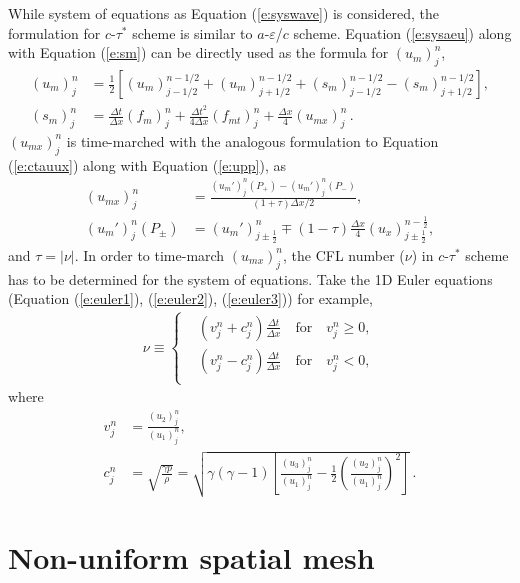 \documentclass[11pt,dvips]{article}
\numberwithin{equation}{section}
\begin{document}
While system of equations as Equation (\ref{e:syswave}) is considered, the
formulation for $c$-$\tau^*$ scheme is similar to $a$-$\varepsilon$/$c$ scheme.
Equation (\ref{e:sysaeu}) along with Equation (\ref{e:sm}) can be directly used
as the formula for $(u_m)_j^n$,
\begin{align*}
  (u_m)_j^n &= \frac{1}{2}\left[
      (u_m)_{j-1/2}^{n-1/2} + (u_m)_{j+1/2}^{n-1/2}
    + (s_m)_{j-1/2}^{n-1/2} - (s_m)_{j+1/2}^{n-1/2}
    \right], \\
  (s_m)_j^n &=
      \frac{\Delta t}  {\Delta x} (f_m)_j^n
    + \frac{\Delta t^2}{4\Delta x}(f_{mt})_j^n
    + \frac{\Delta x}  {4}        (u_{mx})_j^n\,.
\end{align*}
$(u_{mx})_j^n$ is time-marched with the analogous formulation to
Equation (\ref{e:ctauux}) along with Equation (\ref{e:upp}), as
\begin{align}
  (u_{mx})_j^n &=
    \frac{(u_m')_j^n(P_+)-(u_m')_j^n(P_-)}
         {(1+\tau)\Delta x/2}, \\
  (u_m')_j^n(P_{\pm}) &=
        (u_m')_{j\pm\frac{1}{2}}^n
    \mp (1-\tau)\frac{\Delta x}{4}(u_x)_{j\pm\frac{1}{2}}^{n-\frac{1}{2}},
\end{align}
and $\tau=|\nu|$.  In order to time-march $(u_{mx})_j^n$, the CFL number
($\nu$) in $c$-$\tau^*$ scheme has to be determined for the system of
equations.  Take the 1D Euler equations (Equation (\ref{e:euler1}),
(\ref{e:euler2}), (\ref{e:euler3})) for example,
\begin{align}
\nu \equiv \left\{
  \begin{aligned}
    &(v_j^n+c_j^n)\frac{\Delta t}{\Delta x}
      \quad\text{for}\quad v_j^n \ge 0, \\
    &(v_j^n-c_j^n)\frac{\Delta t}{\Delta x}
      \quad\text{for}\quad v_j^n < 0, \\
  \end{aligned}
  \right. \label{e:eulernu}
\end{align}
where
\begin{align}
  v_j^n &=
    \frac{(u_2)_j^n}{(u_1)_j^n}, \label{e:eulerv} \\
  c_j^n &= \sqrt{\frac{\gamma p}{\rho}} =
    \sqrt{\gamma(\gamma-1)
          \left[
              \frac{(u_3)_j^n}{(u_1)_j^n}
            - \frac{1}{2}\left(\frac{(u_2)_j^n}{(u_1)_j^n}\right)^2
          \right]}\,. \label{e:eulerc}
\end{align}

\section{Non-uniform spatial mesh}
\label{s:nuni}
\end{document}
